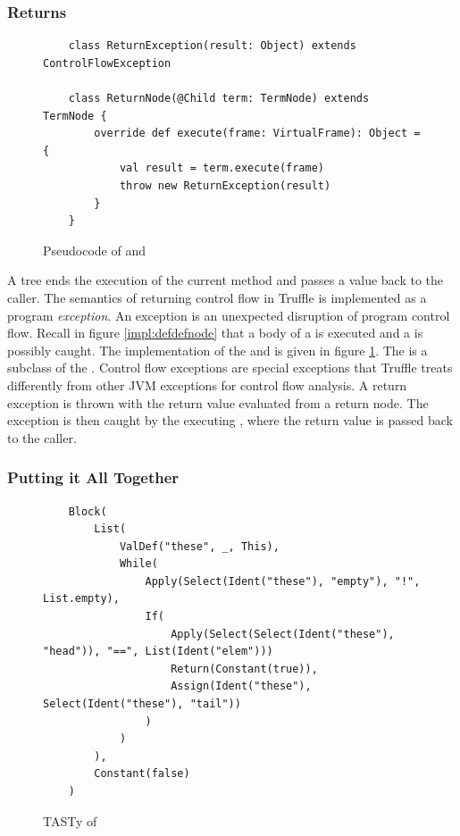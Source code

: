 \subsubsection*{Returns}

\begin{figure}[!htb]
	\begin{verbatim}
	class ReturnException(result: Object) extends ControlFlowException
	
	class ReturnNode(@Child term: TermNode) extends TermNode {
		override def execute(frame: VirtualFrame): Object = { 
			val result = term.execute(frame)
			throw new ReturnException(result)
		}
	}
	\end{verbatim}
	\caption{Pseudocode of  and }
	\label{impl:return}
\end{figure}

A  tree ends the execution of the current method and passes a value back to the caller.
The semantics of returning control flow in Truffle is implemented as a program \textit{exception}.
An exception is an unexpected disruption of program control flow.
Recall in figure \ref{impl:defdefnode} that a body of a  is executed and a  is possibly caught.
The implementation of the  and  is given in figure \ref{impl:return}.
The  is a subclass of the . 
Control flow exceptions are special exceptions that Truffle treats differently from other JVM exceptions for control flow analysis.
A return exception is thrown with the return value evaluated from a return node.
The exception is then caught by the executing , where the return value is passed back to the caller. 

 \subsubsection*{Putting it All Together}

\begin{figure}[!htb]
	\begin{verbatim}
	Block(
		List(
			ValDef("these", _, This),			
			While(
				Apply(Select(Ident("these"), "empty"), "!", List.empty),
				If(
					Apply(Select(Select(Ident("these"), "head")), "==", List(Ident("elem")))
					Return(Constant(true)),
					Assign(Ident("these"), Select(Ident("these"), "tail"))
				)	
			)   
		),
		Constant(false)
	)
	\end{verbatim}
	\caption{TASTy of }
	\label{tasty:list-contains}
\end{figure}


